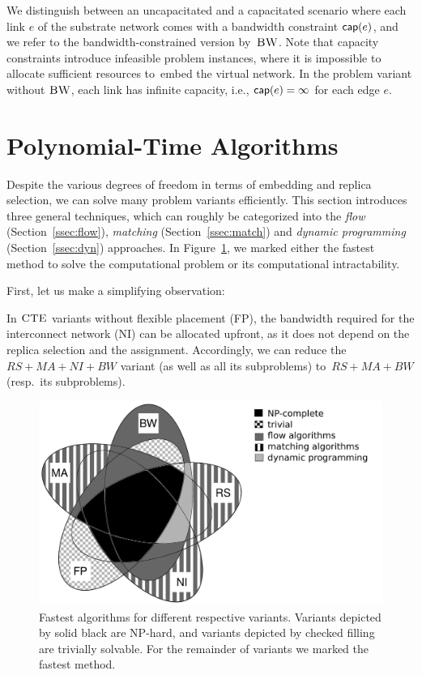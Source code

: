 We distinguish between an uncapacitated and a capacitated scenario where each link $e$
of the substrate network comes with a bandwidth
constraint $\textsf{cap}(e)$, and we refer to the bandwidth-constrained version by~$\textsc{BW}$.
Note that capacity constraints introduce infeasible problem instances, where it is impossible to
allocate sufficient resources to~embed the virtual network.
In the problem variant without $\textsc{BW}$, each link has infinite capacity, i.e., $\textsf{cap}(e) = \infty$ for each edge $e$.

\section{Polynomial-Time Algorithms}\label{sec:poly}


Despite the various degrees of freedom in terms of embedding and replica selection,
we can solve many problem variants efficiently.
 This section introduces three general techniques,
 which can roughly be categorized into
 the \emph{flow} (Section~\ref{ssec:flow}), \emph{matching} (Section~\ref{ssec:match}) and \emph{dynamic programming}
 (Section~\ref{ssec:dyn}) approaches.
In Figure~\ref{fig:venn_full}, we marked either the fastest method to solve the computational problem or its computational intractability.
 
First, let us make a simplifying observation:
\begin{obs}\label{obs:nofp}
In $\textsc{CTE}$ variants without flexible placement (FP),
the bandwidth required
for the interconnect network (NI) can be allocated upfront, 
as it
does not depend on the replica
selection and the assignment.
Accordingly, we can reduce the $RS+MA+NI+BW$ variant (as well as all its subproblems)
to~$RS+MA+BW$ (resp.~its subproblems).
\end{obs}

\begin{figure}[t]
\centering
\includegraphics[width=0.69\columnwidth]{figs/static-mapping/venn_full2}
\caption{Fastest algorithms for different respective variants. Variants depicted by solid black are NP-hard, and variants depicted by checked filling are trivially solvable. For the remainder of variants we marked the fastest method.}
\label{fig:venn_full}
\end{figure}


